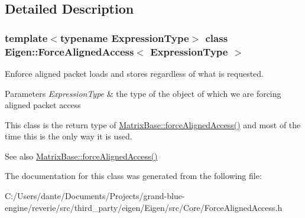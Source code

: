 \subsection{Detailed Description}
\subsubsection*{template$<$typename Expression\+Type$>$\newline
class Eigen\+::\+Force\+Aligned\+Access$<$ Expression\+Type $>$}

Enforce aligned packet loads and stores regardless of what is requested. 


\begin{DoxyParams}{Parameters}
{\em Expression\+Type} & the type of the object of which we are forcing aligned packet access\\
\hline
\end{DoxyParams}
This class is the return type of \mbox{\hyperlink{class_eigen_1_1_matrix_base_afdaf810ac1708ca6d6ecdcfac1e06699}{Matrix\+Base\+::force\+Aligned\+Access()}} and most of the time this is the only way it is used.

\begin{DoxySeeAlso}{See also}
\mbox{\hyperlink{class_eigen_1_1_matrix_base_afdaf810ac1708ca6d6ecdcfac1e06699}{Matrix\+Base\+::force\+Aligned\+Access()}} 
\end{DoxySeeAlso}


The documentation for this class was generated from the following file\+:\begin{DoxyCompactItemize}
\item 
C\+:/\+Users/dante/\+Documents/\+Projects/grand-\/blue-\/engine/reverie/src/third\+\_\+party/eigen/\+Eigen/src/\+Core/Force\+Aligned\+Access.\+h\end{DoxyCompactItemize}
